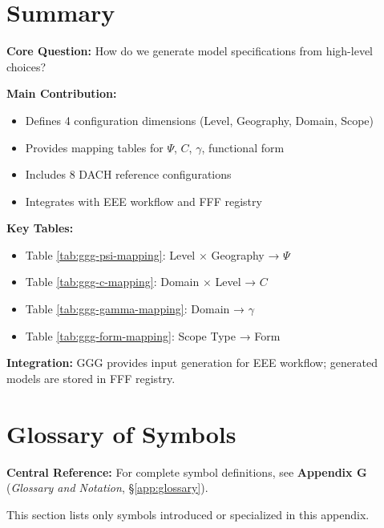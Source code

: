 \section{Summary}
\label{sec:ggg-summary}

\begin{tcolorbox}[colback=green!10!white, colframe=green!75!black,
    title=\textbf{Appendix GGG: Summary}]

\textbf{Core Question:} How do we generate model specifications from high-level choices?

\textbf{Main Contribution:}
\begin{itemize}[nosep]
    \item Defines 4 configuration dimensions (Level, Geography, Domain, Scope)
    \item Provides mapping tables for $\Psi$, $C$, $\gamma$, functional form
    \item Includes 8 DACH reference configurations
    \item Integrates with EEE workflow and FFF registry
\end{itemize}

\textbf{Key Tables:}
\begin{itemize}[nosep]
    \item Table \ref{tab:ggg-psi-mapping}: Level × Geography → $\Psi$
    \item Table \ref{tab:ggg-c-mapping}: Domain × Level → $C$
    \item Table \ref{tab:ggg-gamma-mapping}: Domain → $\gamma$
    \item Table \ref{tab:ggg-form-mapping}: Scope Type → Form
\end{itemize}

\textbf{Integration:} GGG provides input generation for EEE workflow;
generated models are stored in FFF registry.

\end{tcolorbox}


\section{Glossary of Symbols}
\label{sec:ggg-glossary}

\begin{tcolorbox}[colback=blue!5!white, colframe=blue!75!black]
\textbf{Central Reference:} For complete symbol definitions, see
\textbf{Appendix G} (\textit{Glossary and Notation}, \S\ref{app:glossary}).

This section lists only symbols introduced or specialized in this appendix.
\end{tcolorbox}

